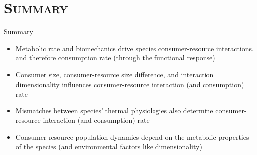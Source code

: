 \section{\scshape Summary}
   
  \begin{frame}{Summary}
  
    \begin{itemize}[<+->] \setlength{\itemindent}{0em} \itemsep10pt
  
      \item Metabolic rate and biomechanics drive
      species consumer-resource interactions, and therefore consumption rate (through the functional response)
  
      \item Consumer size, consumer-resource size difference, and interaction dimensionality influences consumer-resource interaction (and consumption) rate  
  
      \item Mismatches between species' thermal physiologies also determine
      consumer-resource interaction (and consumption) rate

      \item Consumer-resource population dynamics depend on the metabolic properties of the species (and environmental factors like dimensionality)

    \end{itemize}
  
  \end{frame}  

